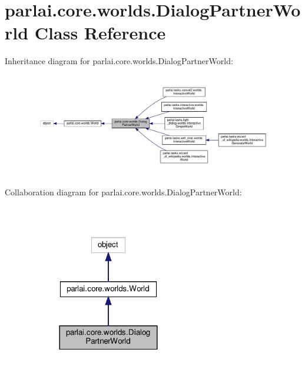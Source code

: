 \hypertarget{classparlai_1_1core_1_1worlds_1_1DialogPartnerWorld}{}\section{parlai.\+core.\+worlds.\+Dialog\+Partner\+World Class Reference}
\label{classparlai_1_1core_1_1worlds_1_1DialogPartnerWorld}


Inheritance diagram for parlai.\+core.\+worlds.\+Dialog\+Partner\+World\+:
\nopagebreak
\begin{figure}[H]
\begin{center}
\leavevmode
\includegraphics[width=350pt]{d0/d5c/classparlai_1_1core_1_1worlds_1_1DialogPartnerWorld__inherit__graph}
\end{center}
\end{figure}


Collaboration diagram for parlai.\+core.\+worlds.\+Dialog\+Partner\+World\+:
\nopagebreak
\begin{figure}[H]
\begin{center}
\leavevmode
\includegraphics[width=204pt]{d8/dde/classparlai_1_1core_1_1worlds_1_1DialogPartnerWorld__coll__graph}
\end{center}
\end{figure}

